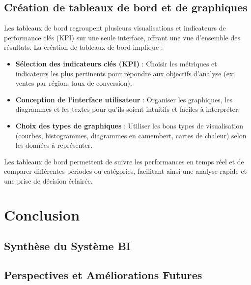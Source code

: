 \documentclass[a4paper,12pt]{report}
\begin{document}
\section{Création de tableaux de bord et de graphiques}
Les tableaux de bord regroupent plusieurs visualisations et indicateurs de performance clés (KPI) sur une seule interface, offrant une vue d'ensemble des résultats. La création de tableaux de bord implique :
\begin{itemize}
    \item \textbf{Sélection des indicateurs clés (KPI)} : Choisir les métriques et indicateurs les plus pertinents pour répondre aux objectifs d'analyse (ex: ventes par région, taux de conversion).
    \item \textbf{Conception de l'interface utilisateur} : Organiser les graphiques, les diagrammes et les textes pour qu'ils soient intuitifs et faciles à interpréter.
    \item \textbf{Choix des types de graphiques} : Utiliser les bons types de visualisation (courbes, histogrammes, diagrammes en camembert, cartes de chaleur) selon les données à représenter.
\end{itemize}
Les tableaux de bord permettent de suivre les performances en temps réel et de comparer différentes périodes ou catégories, facilitant ainsi une analyse rapide et une prise de décision éclairée.










\chapter{Conclusion}
\section{Synthèse du Système BI}
\section{Perspectives et Améliorations Futures}
\end{document}
